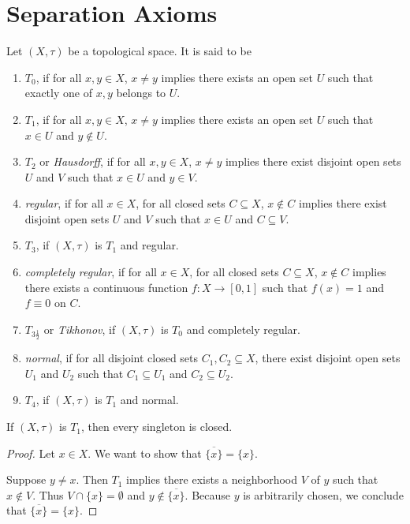 \documentclass[screen,single]{techreport}
\numberwithin{equation}{section}
\begin{document}
\section{Separation Axioms}

\begin{definition}\label{De:AxiomsOfSeparation}
	Let $(X,\tau)$ be a topological space.
	It is said to be
	\begin{enumerate}
		\item $T_0$, if for all $x,y \in X$, $x \neq y$ implies there exists an open set $U$ such that exactly one of $x,y$ belongs to $U$.
		\item $T_1$, if for all $x,y \in X$, $x \neq y$ implies there exists an open set $U$ such that $x \in U$ and $y \not\in U$.
		\item $T_2$ or \emph{Hausdorff}, if for all $x,y \in X$, $x \neq y$ implies there exist disjoint open sets $U$ and $V$ such that $x \in U$ and $y \in V$.
		\item \emph{regular}, if for all $x \in X$, for all closed sets $C \subseteq X$, $x \not\in C$ implies there exist disjoint open sets $U$ and $V$ such that $x \in U$ and $C \subseteq V$.
		\item $T_3$, if $(X,\tau)$ is $T_1$ and regular.
		\item \emph{completely regular}, if for all $x \in X$, for all closed sets $C \subseteq X$, $x \not\in C$ implies there exists a continuous function $f : X \to [0,1]$ such that $f(x) = 1$ and $f \equiv 0$ on $C$.
		\item $T_{3\frac{1}{2}}$ or \emph{Tikhonov}, if $(X,\tau)$ is $T_0$ and completely regular.
		\item \emph{normal}, if for all disjoint closed sets $C_1,C_2 \subseteq X$, there exist disjoint open sets $U_1$ and $U_2$ such that $C_1 \subseteq U_1$ and $C_2 \subseteq U_2$.
		\item $T_4$, if $(X,\tau)$ is $T_1$ and normal.
	\end{enumerate}
\end{definition}

\begin{proposition}\label{Prop:T1SingletonClosed}
	If $(X,\tau)$ is $T_1$, then every singleton is closed.
\end{proposition}
\begin{proof}
	Let $x \in X$. We want to show that $\overline{\{x\}} = \{x\}$.
	
	Suppose $y \neq x$.
	Then $T_1$ implies there exists a neighborhood $V$ of $y$ such that $x \not\in V$.
	Thus $V \cap \{x\} = \emptyset$ and $y \not\in \overline{\{x\}}$.
	Because $y$ is arbitrarily chosen, we conclude that $\overline{\{x\}} = \{x\}$.
\end{proof}
\end{document}
